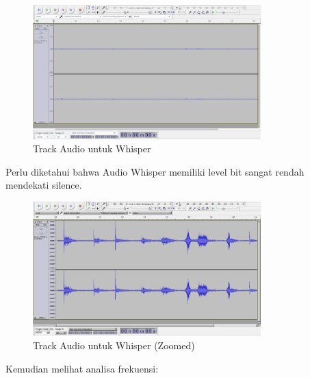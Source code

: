 \documentclass[12pt,]{article}
\begin{document}
	\begin{figure}[!ht]
		\centering
		\includegraphics[width=250pt]{images/elitech_testAudioWhisperOri}
		\caption{Track Audio untuk Whisper}
	\end{figure}

	\newpage
	Perlu diketahui bahwa Audio Whisper memiliki level bit sangat rendah mendekati silence.

	\begin{figure}[!ht]
		\centering
		\includegraphics[width=250pt]{images/elitech_testAudioWhisper}
		\caption{Track Audio untuk Whisper (Zoomed)}
	\end{figure}

	Kemudian melihat analisa frekuensi:
\end{document}
